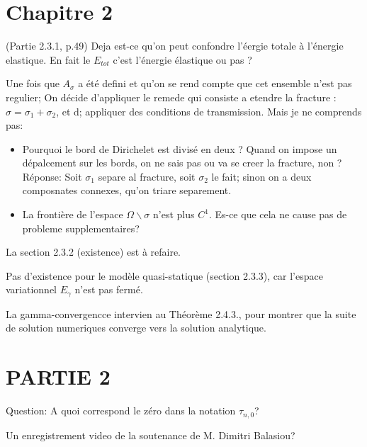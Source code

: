 \documentclass[
  french,
	10pt, %
]{fphw}
\begin{document}
\section{Chapitre 2}

(Partie 2.3.1, p.49)
Deja est-ce qu'on peut confondre l'éergie totale à l'énergie elastique. En fait le $E_{tot}$ c'est l'énergie élastique ou pas ?

Une fois que $A_{\sigma}$ a été defini et qu'on se rend compte que cet ensemble n'est pas regulier; On décide d'appliquer le remede qui consiste a etendre la fracture : $\sigma = \sigma_1 + \sigma_2$, et d; appliquer des conditions de transmission. Mais je ne comprends pas:
\begin{itemize}
  \item Pourquoi le bord de Dirichelet est divisé en deux ? Quand on impose un dépalcement sur les bords, on ne sais pas ou va se creer la fracture, non ? Réponse: Soit $\sigma_1$ separe al fracture, soit $\sigma_2$ le fait; sinon on a deux composnates connexes, qu'on triare separement.  
  \item La frontière de l'espace $\Omega \backslash \sigma$ n'est plus $C^1$. Es-ce que cela ne cause pas de probleme supplementaires?  
\end{itemize}

La section 2.3.2 (existence) est à refaire.

Pas d'existence pour le modèle quasi-statique (section 2.3.3), car l'espace variationnel $E_{\gamma}$ n'est pas fermé.

La gamma-convergencce intervien au Théorème 2.4.3., pour montrer que la suite de solution numeriques converge vers la solution analytique. 


\section{PARTIE 2}

Question: A quoi correspond le zéro dans la notation $\tau_{n,0}$?

Un enregistrement video de la soutenance de M. Dimitri Balasiou? 


\end{document}

